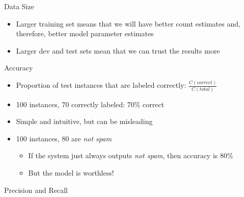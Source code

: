 \documentclass[11pt,letterpaper]{article}
\begin{document}
Data Size

\begin{itemize}
  \item Larger training set means that we will have better count estimates and, therefore, better model parameter estimates
  \item Larger dev and test sets mean that we can trust the results more
\end{itemize}


Accuracy

\begin{itemize}
  \item Proportion of test instances that are labeled correctly: $\frac{C(correct)}{C(total)}$
  \item 100 instances, 70 correctly labeled: 70\% correct
  \item Simple and intuitive, but can be misleading
  \item 100 instances, 80 are \textit{not spam}
    \begin{itemize}
      \item If the system just always outputs \textit{not spam}, then accuracy is 80\%
      \item But the model is worthless!
    \end{itemize}
\end{itemize}


Precision and Recall
\end{document}
